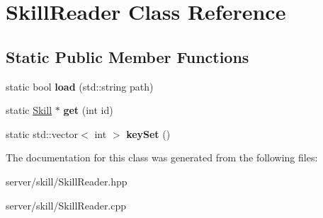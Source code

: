 \hypertarget{class_skill_reader}{\section{Skill\-Reader Class Reference}
\label{class_skill_reader}
}
\subsection*{Static Public Member Functions}
\begin{DoxyCompactItemize}
\item 
\hypertarget{class_skill_reader_aee4e2f6ef04a13d9d20fe0ac1394aba4}{static bool {\bfseries load} (std\-::string path)}\label{class_skill_reader_aee4e2f6ef04a13d9d20fe0ac1394aba4}

\item 
\hypertarget{class_skill_reader_a39e5ca48826e74cda1a995913fabeeed}{static \hyperlink{class_skill}{Skill} $\ast$ {\bfseries get} (int id)}\label{class_skill_reader_a39e5ca48826e74cda1a995913fabeeed}

\item 
\hypertarget{class_skill_reader_a37f77e4646f0857bff23702910190dc5}{static std\-::vector$<$ int $>$ {\bfseries key\-Set} ()}\label{class_skill_reader_a37f77e4646f0857bff23702910190dc5}

\end{DoxyCompactItemize}


The documentation for this class was generated from the following files\-:\begin{DoxyCompactItemize}
\item 
server/skill/Skill\-Reader.\-hpp\item 
server/skill/Skill\-Reader.\-cpp\end{DoxyCompactItemize}
